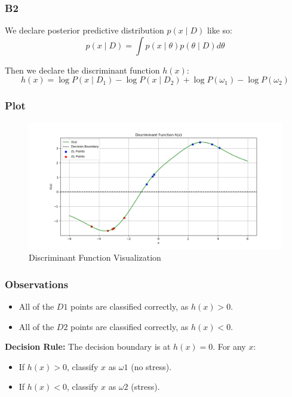 \documentclass{beamer}
\begin{document}
\begin{frame}
\frametitle{B2}
We declare posterior predictive distribution $p(x \mid D)$ like so:
$$
p(x \mid D) = \int p(x \mid \theta) p(\theta \mid D) d\theta
$$

Then we declare the discriminant function $h(x)$:
$$
h(x) = \log P(x \mid D_1) - \log P(x \mid D_2) + \log P(\omega_1) - \log P(\omega_2)
$$
\end{frame}

\begin{frame}
\frametitle{Plot}
\begin{figure}
    \centering
    \includegraphics[width=1\linewidth]{assets/B2.png}
    \caption{Discriminant Function Visualization}
    \label{fig:enter-label}
\end{figure}
\end{frame}

\begin{frame}
\frametitle{Observations}
\begin{itemize}
    \item All of the $D1$ points are classified correctly, as $h(x) > 0$.
    \item All of the $D2$ points are classified correctly, as $h(x) < 0$.
\end{itemize}
\vspace{1cm}
\textbf{Decision Rule:} The decision boundary is at $h(x) = 0$. For any $x$:
\begin{itemize}
    \item If $h(x) > 0$, classify $x$ as $ω1$ (no stress).
    \item If $h(x) < 0$, classify $x$ as $ω2$ (stress).
\end{itemize}
\end{frame}
\end{document}
